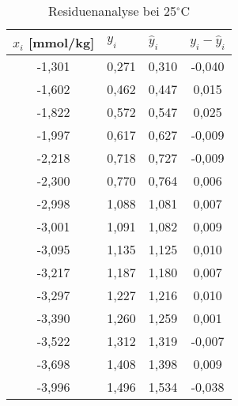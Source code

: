 \begin{table}[H]
  \centering
  \caption{Residuenanalyse bei 25$^\circ$C}
    \begin{tabular}{cccc}
    \toprule
    \multicolumn{1}{l}{\boldmath{}\textbf{$x_i$ [mmol/kg]}\unboldmath{}} & \multicolumn{1}{l}{\boldmath{}\textbf{$y_i$}\unboldmath{}} & \multicolumn{1}{l}{\boldmath{}\textbf{$\hat{y}_i$}\unboldmath{}} & \multicolumn{1}{l}{\boldmath{}\textbf{$y_i - \hat{y}_i$}\unboldmath{}} \\
    \midrule
    -1,301 & 0,271 & 0,310 & -0,040 \\
    -1,602 & 0,462 & 0,447 & 0,015 \\
    -1,822 & 0,572 & 0,547 & 0,025 \\
    -1,997 & 0,617 & 0,627 & -0,009 \\
    -2,218 & 0,718 & 0,727 & -0,009 \\
    -2,300 & 0,770 & 0,764 & 0,006 \\
    -2,998 & 1,088 & 1,081 & 0,007 \\
    -3,001 & 1,091 & 1,082 & 0,009 \\
    -3,095 & 1,135 & 1,125 & 0,010 \\
    -3,217 & 1,187 & 1,180 & 0,007 \\
    -3,297 & 1,227 & 1,216 & 0,010 \\
    -3,390 & 1,260 & 1,259 & 0,001 \\
    -3,522 & 1,312 & 1,319 & -0,007 \\
    -3,698 & 1,408 & 1,398 & 0,009 \\
    -3,996 & 1,496 & 1,534 & -0,038 \\
    \bottomrule
    \end{tabular}%
  \label{tab:addlabel}%
\end{table}%
